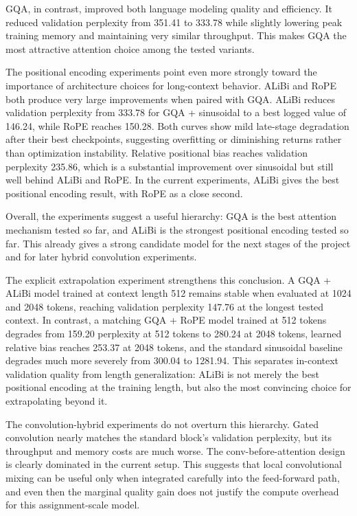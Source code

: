\documentclass{article}
\begin{document}
GQA, in contrast, improved both language modeling quality and efficiency. It
reduced validation perplexity from 351.41 to 333.78 while slightly lowering peak
training memory and maintaining very similar throughput. This makes GQA the most
attractive attention choice among the tested variants.

The positional encoding experiments point even more strongly toward the
importance of architecture choices for long-context behavior. ALiBi and RoPE
both produce very large improvements when paired with GQA. ALiBi reduces
validation perplexity from 333.78 for GQA + sinusoidal to a best logged value of
146.24, while RoPE reaches 150.28. Both curves show mild late-stage degradation
after their best checkpoints, suggesting overfitting or diminishing returns
rather than optimization instability. Relative positional bias reaches validation
perplexity 235.86, which is a substantial improvement over sinusoidal but still
well behind ALiBi and RoPE. In the current experiments, ALiBi gives the best
positional encoding result, with RoPE as a close second.

Overall, the experiments suggest a useful hierarchy: GQA is the best attention
mechanism tested so far, and ALiBi is the strongest positional encoding tested so far.
This already gives a strong candidate model for the next stages of the project
and for later hybrid convolution experiments.

The explicit extrapolation experiment strengthens this conclusion. A GQA +
ALiBi model trained at context length 512 remains stable when evaluated at 1024
and 2048 tokens, reaching validation perplexity 147.76 at the longest tested
context. In contrast, a matching GQA + RoPE model trained at 512 tokens degrades
from 159.20 perplexity at 512 tokens to 280.24 at 2048 tokens, learned relative
bias reaches 253.37 at 2048 tokens, and the standard sinusoidal baseline
degrades much more severely from 300.04 to 1281.94. This separates in-context
validation quality from length generalization: ALiBi is not merely the best
positional encoding at the training length, but also the most convincing choice
for extrapolating beyond it.

The convolution-hybrid experiments do not overturn this hierarchy. Gated
convolution nearly matches the standard block's validation perplexity, but its
throughput and memory costs are much worse. The conv-before-attention design is
clearly dominated in the current setup. This suggests that local convolutional
mixing can be useful only when integrated carefully into the feed-forward path,
and even then the marginal quality gain does not justify the compute overhead
for this assignment-scale model.
\end{document}
